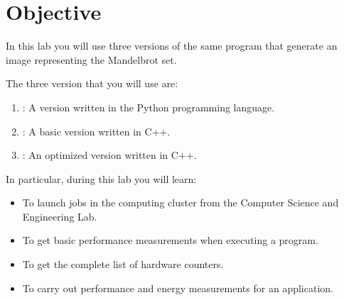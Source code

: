 \section{Objective}

In this lab you will use three versions of the same program
that generate an image representing the Mandelbrot set.

The three version that you will use are:

\begin{enumerate}
  \item {}: 
        A version written in the Python programming language.
  \item {}: 
        A basic version written in C++.
  \item {}: 
        An optimized version written in C++.
\end{enumerate}

In particular, during this lab you will learn:


\begin{itemize}
  \item To launch jobs in the computing cluster from the Computer Science and Engineering Lab.
  \item To get basic performance measurements when executing a program.
  \item To get the complete list of hardware counters.
  \item To carry out performance and energy measurements for an application.
\end{itemize}

